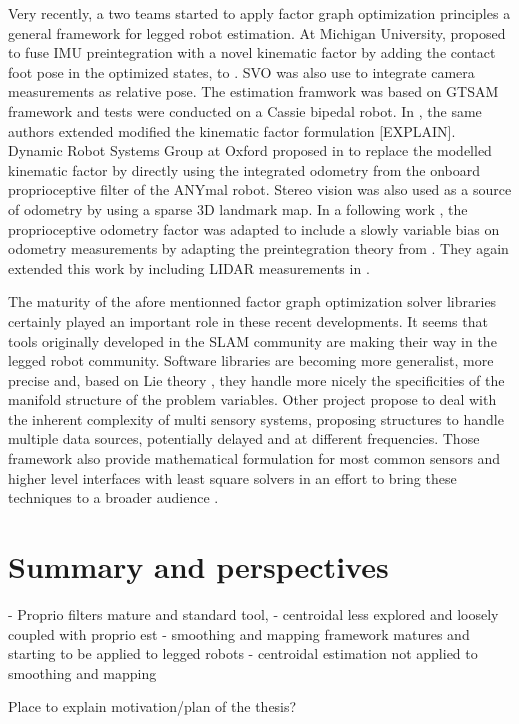 Very recently, a two teams started to apply factor graph optimization principles a general framework for legged robot estimation. At Michigan University, \cite{hartley2018legged} 
proposed to fuse IMU preintegration with a novel kinematic factor by adding the contact foot pose in the optimized states, to \cite{bloesch2013state,rotella2014state}. 
SVO \cite{forster2014svo} was also use to integrate camera measurements as relative pose. The estimation framwork was based on GTSAM framework \cite{dellaert2012factor}
and tests were conducted on a Cassie bipedal robot. In \cite{hartley2018hybrid}, the same authors extended 
modified the kinematic factor formulation [EXPLAIN]. Dynamic Robot Systems Group at Oxford proposed in \cite{wisth2019robust} to replace the modelled 
kinematic factor by directly using the integrated odometry from the onboard proprioceptive filter of the ANYmal robot. Stereo vision was also used as a source of
odometry by using a sparse 3D landmark map. In a following work \cite{wisth2020preintegrated}, the proprioceptive odometry factor was adapted
to include a slowly variable bias on odometry measurements by adapting the preintegration theory from \cite{forster2017-TRO}. They again extended this work
by including LIDAR measurements in \cite{wisth2021vilens}.


The maturity of the afore mentionned factor graph optimization solver libraries certainly played an important role in these recent developments. It seems
that tools originally developed in the SLAM community are making their way in the legged robot community. Software libraries are becoming more
generalist, more precise and, based on Lie theory \cite{sola2018micro}, they handle more nicely the specificities of the manifold structure of the problem variables.
Other project propose to deal with the inherent complexity of multi sensory systems, proposing structures to handle multiple data sources, potentially delayed and at
different frequencies. Those framework also provide mathematical formulation for most common sensors and higher level interfaces with least square solvers 
in an effort to bring these techniques to a broader audience \cite{sola2021wolf, blanco2019modular, colosi2020plug}.



\section{Summary and perspectives}
- Proprio filters mature and standard tool, 
- centroidal less explored and loosely coupled with proprio est
- smoothing and mapping framework matures and starting to be applied to legged robots
- centroidal estimation not applied to smoothing and mapping

Place to explain motivation/plan of the thesis?
